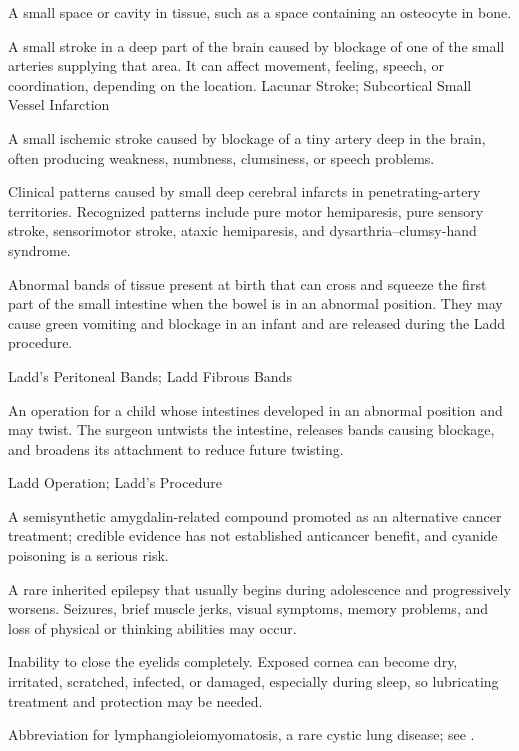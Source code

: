  A small space or cavity in tissue, such as a space containing an osteocyte in bone.

 A small stroke in a deep part of the brain caused by blockage of one of the small arteries supplying that area. It can affect movement, feeling, speech, or coordination, depending on the location.
\synonyms
Lacunar Stroke; Subcortical Small Vessel Infarction

 A small ischemic stroke caused by blockage of a tiny artery deep in the brain, often producing weakness, numbness, clumsiness, or speech problems.

 Clinical patterns caused by small deep cerebral infarcts in penetrating-artery territories. Recognized patterns include pure motor hemiparesis, pure sensory stroke, sensorimotor stroke, ataxic hemiparesis, and dysarthria–clumsy-hand syndrome.

 Abnormal bands of tissue present at birth that can cross and squeeze the first part of the small intestine when the bowel is in an abnormal position. They may cause green vomiting and blockage in an infant and are released during the Ladd procedure.

\synonyms
Ladd's Peritoneal Bands; Ladd Fibrous Bands

 An operation for a child whose intestines developed in an abnormal position and may twist. The surgeon untwists the intestine, releases bands causing blockage, and broadens its attachment to reduce future twisting.

\synonyms
Ladd Operation; Ladd's Procedure

 A semisynthetic amygdalin-related compound promoted as an alternative cancer treatment; credible evidence has not established anticancer benefit, and cyanide poisoning is a serious risk.

 A rare inherited epilepsy that usually begins during adolescence and progressively worsens. Seizures, brief muscle jerks, visual symptoms, memory problems, and loss of physical or thinking abilities may occur.

 Inability to close the eyelids completely. Exposed cornea can become dry, irritated, scratched, infected, or damaged, especially during sleep, so lubricating treatment and protection may be needed.

 Abbreviation for lymphangioleiomyomatosis, a rare cystic lung disease; see .

